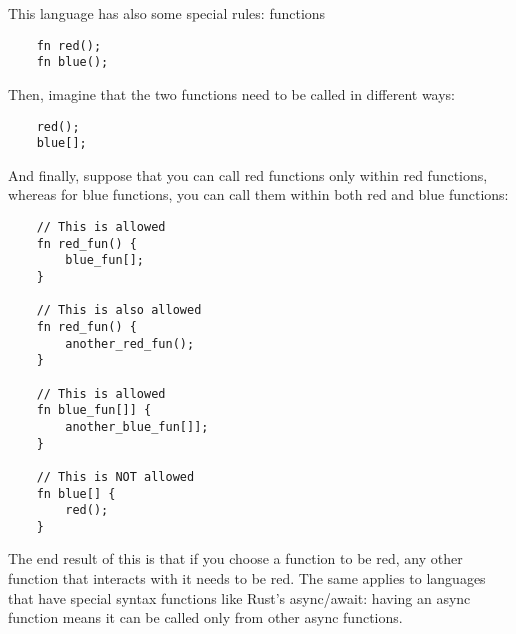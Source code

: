 This language has also some special rules: functions
\begin{lstlisting}
    fn red();
    fn blue();
\end{lstlisting}

Then, imagine that the two functions need to be called in different ways:

\begin{lstlisting}
    red();
    blue[];
\end{lstlisting}

And finally, suppose that you can call red functions only within red functions, whereas for blue functions, you can call them within both red and blue functions:

\begin{lstlisting}
    // This is allowed
    fn red_fun() {
        blue_fun[];
    }

    // This is also allowed
    fn red_fun() {
        another_red_fun();
    }

    // This is allowed
    fn blue_fun[]] {
        another_blue_fun[]];
    }

    // This is NOT allowed
    fn blue[] {
        red();
    }
\end{lstlisting}

The end result of this is that if you choose a function to be red, any other function that interacts with it needs to be red. The same applies to languages that have special syntax functions
like Rust's async/await: having an async function means it can be called only from other async functions.